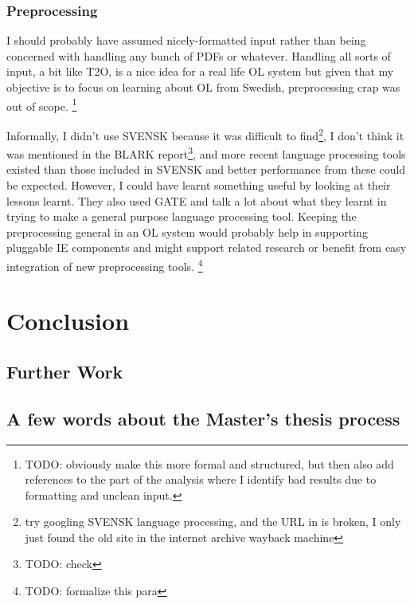 \documentclass[a4paper]{report}
\newcommand{\todo}[1]{\footnote{{\color{red} TODO: #1}}}
\begin{document}
\subsection{Preprocessing}

I should probably have assumed nicely-formatted input rather than being concerned with handling any bunch of PDFs or whatever.
Handling all sorts of input, a bit like T2O, is a nice idea for a real life OL system but given that my objective is to focus on learning about OL from Swedish, preprocessing crap was out of scope. 
\todo{obviously make this more formal and structured, but then also add references to the part of the analysis where I identify bad results due to formatting and unclean input.}

Informally, I didn't use SVENSK because it was difficult to find\footnote{try googling SVENSK language processing, and the URL in \cite{Olsson98SVENSKTagging} is broken, I only just found the old site in the internet archive wayback machine}, I don't think it was mentioned in the BLARK report\todo{check}, and more recent language processing tools existed than those included in SVENSK and better performance from these could be expected.
However, I could have learnt something useful by looking at their lessons learnt.
They also used GATE and talk a lot about what they learnt in trying to make a general purpose language processing tool.
Keeping the preprocessing general in an OL system would probably help in supporting pluggable IE components and might support related research or benefit from easy integration of new preprocessing tools. \todo{formalize this para}


\chapter{Conclusion}

\section{Further Work}

\section{A few words about the Master's thesis process}
\end{document}
